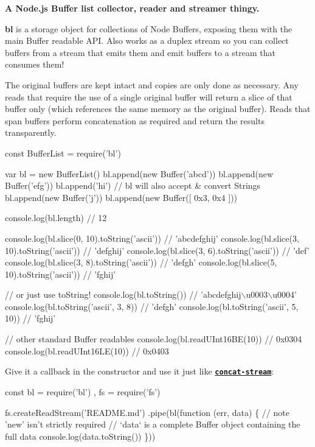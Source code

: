\href{https://travis-ci.org/rvagg/bl}{\tt }

{\bfseries A Node.\+js Buffer list collector, reader and streamer thingy.}

\href{https://nodei.co/npm/bl/}{\tt } \href{https://nodei.co/npm/bl/}{\tt }

{\bfseries bl} is a storage object for collections of Node Buffers, exposing them with the main Buffer readable A\+PI. Also works as a duplex stream so you can collect buffers from a stream that emits them and emit buffers to a stream that consumes them!

The original buffers are kept intact and copies are only done as necessary. Any reads that require the use of a single original buffer will return a slice of that buffer only (which references the same memory as the original buffer). Reads that span buffers perform concatenation as required and return the results transparently.


\begin{DoxyCode}
const BufferList = require('bl')

var bl = new BufferList()
bl.append(new Buffer('abcd'))
bl.append(new Buffer('efg'))
bl.append('hi')                     // bl will also accept & convert Strings
bl.append(new Buffer('j'))
bl.append(new Buffer([ 0x3, 0x4 ]))

console.log(bl.length) // 12

console.log(bl.slice(0, 10).toString('ascii')) // 'abcdefghij'
console.log(bl.slice(3, 10).toString('ascii')) // 'defghij'
console.log(bl.slice(3, 6).toString('ascii'))  // 'def'
console.log(bl.slice(3, 8).toString('ascii'))  // 'defgh'
console.log(bl.slice(5, 10).toString('ascii')) // 'fghij'

// or just use toString!
console.log(bl.toString())               // 'abcdefghij\(\backslash\)u0003\(\backslash\)u0004'
console.log(bl.toString('ascii', 3, 8))  // 'defgh'
console.log(bl.toString('ascii', 5, 10)) // 'fghij'

// other standard Buffer readables
console.log(bl.readUInt16BE(10)) // 0x0304
console.log(bl.readUInt16LE(10)) // 0x0403
\end{DoxyCode}


Give it a callback in the constructor and use it just like {\bfseries \href{https://github.com/maxogden/node-concat-stream}{\tt concat-\/stream}}\+:


\begin{DoxyCode}
const bl = require('bl')
    , fs = require('fs')

fs.createReadStream('README.md')
  .pipe(bl(function (err, data) \{ // note 'new' isn't strictly required
    // `data` is a complete Buffer object containing the full data
    console.log(data.toString())
  \}))
\end{DoxyCode}


